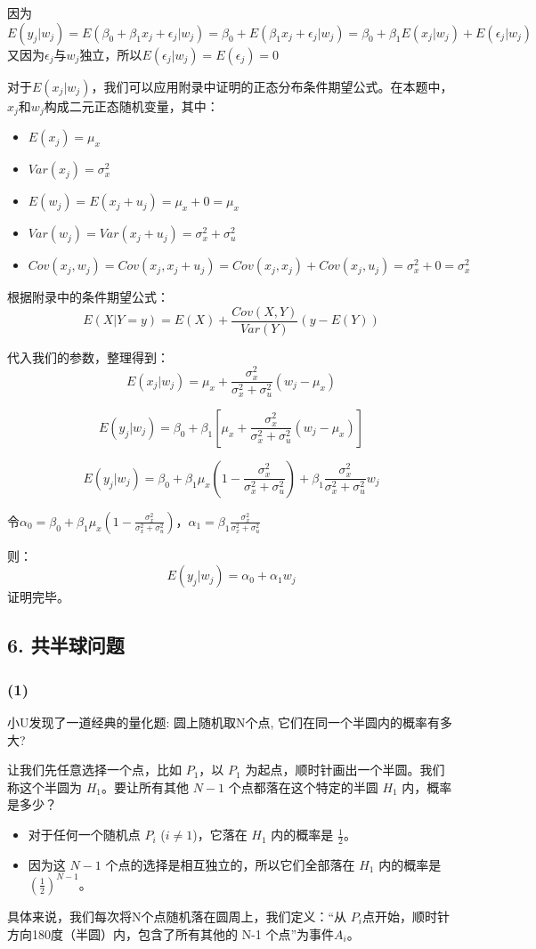 \documentclass[UTF8]{ctexart}
\begin{document}
因为$E(y_{j}|w_{j})=E(\beta_{0}+\beta_{1}x_{j}+\epsilon_{j}|w_{j})=\beta_{0}+E(\beta_{1}x_{j}+\epsilon_{j}|w_{j})=\beta_{0}+\beta_{1}E(x_{j}|w_{j})+E(\epsilon_{j}|w_{j})$
又因为$\epsilon_{j}$与$w_{j}$独立，所以$E(\epsilon_{j}|w_{j})=E(\epsilon_{j})=0$

对于$E(x_{j}|w_{j})$，我们可以应用附录中证明的正态分布条件期望公式。在本题中，$x_j$和$w_j$构成二元正态随机变量，其中：
\begin{itemize}
    \item $E(x_j) = \mu_x$
    \item $Var(x_j) = \sigma_x^2$
    \item $E(w_j) = E(x_j + u_j) = \mu_x + 0 = \mu_x$
    \item $Var(w_j) = Var(x_j + u_j) = \sigma_x^2 + \sigma_u^2$
    \item $Cov(x_j, w_j) = Cov(x_j, x_j + u_j) = Cov(x_j, x_j) + Cov(x_j, u_j) = \sigma_x^2 + 0 = \sigma_x^2$
\end{itemize}

根据附录中的条件期望公式：
$$E(X|Y=y) = E(X) + \frac{Cov(X,Y)}{Var(Y)}(y - E(Y))$$

代入我们的参数，整理得到：
$$
E(x_{j}|w_{j}) = \mu_{x} + \frac{\sigma_{x}^{2}}{\sigma_{x}^{2} + \sigma_{u}^{2}}(w_{j} - \mu_{x})
$$

$$E(y_{j}|w_{j}) = \beta_{0} + \beta_{1}\left[\mu_{x} + \frac{\sigma_{x}^{2}}{\sigma_{x}^{2} + \sigma_{u}^{2}}(w_{j} - \mu_{x})\right]$$


$$E(y_{j}|w_{j}) = \beta_{0} + \beta_{1}\mu_{x}\left(1-\frac{\sigma_{x}^{2}}{\sigma_{x}^{2} + \sigma_{u}^{2}}\right) + \beta_{1}\frac{\sigma_{x}^{2}}{\sigma_{x}^{2} + \sigma_{u}^{2}}w_{j}$$

令$\alpha_{0} = \beta_{0} + \beta_{1}\mu_{x}\left(1-\frac{\sigma_{x}^{2}}{\sigma_{x}^{2} + \sigma_{u}^{2}}\right)$，$\alpha_{1} = \beta_{1}\frac{\sigma_{x}^{2}}{\sigma_{x}^{2} + \sigma_{u}^{2}}$

则：
$$E(y_{j}|w_{j}) = \alpha_{0} + \alpha_{1}w_{j}$$
证明完毕。
\subsection*{6. 共半球问题}
\subsubsection*{(1)}
小U发现了一道经典的量化题: 圆上随机取N个点, 它们在同一个半圆内的概率有多大?

让我们先任意选择一个点，比如 \(P_1\)，以 $P_1$ 为起点，顺时针画出一个半圆。我们称这个半圆为 $H_1$。要让所有其他 $N-1$ 个点都落在这个特定的半圆 $H_1$ 内，概率是多少？
\begin{itemize}
    \item 对于任何一个随机点 $P_i$ ($i \neq 1$)，它落在 $H_1$ 内的概率是 $\frac{1}{2}$。
    \item 因为这 $N-1$ 个点的选择是相互独立的，所以它们全部落在 $H_1$ 内的概率是 $(\frac{1}{2})^{N-1}$。
\end{itemize}
具体来说，我们每次将N个点随机落在圆周上，我们定义：“从 $P_i$点开始，顺时针方向180度（半圆）内，包含了所有其他的 N-1 个点”为事件$A_i$。
\end{document}
